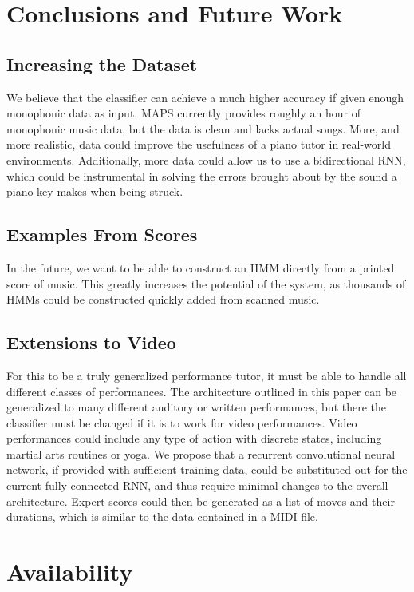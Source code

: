 \documentclass[twocolumn]{article}
\begin{document}
\section{Conclusions and Future Work}

\subsection{Increasing the Dataset}

We believe that the classifier can achieve a much higher accuracy if given enough monophonic data as input. MAPS currently provides roughly an hour of monophonic music data, but the data is clean and lacks actual songs. More, and more realistic, data could improve the usefulness of a piano tutor in real-world environments. Additionally, more data could allow us to use a bidirectional RNN, which could be instrumental in solving the errors brought about by the sound a piano key makes when being struck.

\subsection{Examples From Scores}

In the future, we want to be able to construct an HMM directly from a printed score of music. This greatly increases the potential of the system, as thousands of HMMs could be constructed quickly added from scanned music. 

\subsection{Extensions to Video}

For this to be a truly generalized performance tutor, it must be able to handle all different classes of performances. The architecture outlined in this paper can be generalized to many different auditory or written performances, but there the classifier must be changed if it is to work for video performances. Video performances could include any type of action with discrete states, including martial arts routines or yoga. We propose that a recurrent convolutional neural network, if provided with sufficient training data, could be substituted out for the current fully-connected RNN, and thus require minimal changes to the overall architecture. Expert scores could then be generated as a list of moves and their durations, which is similar to the data contained in a MIDI file.


\section{Availability}
\end{document}

